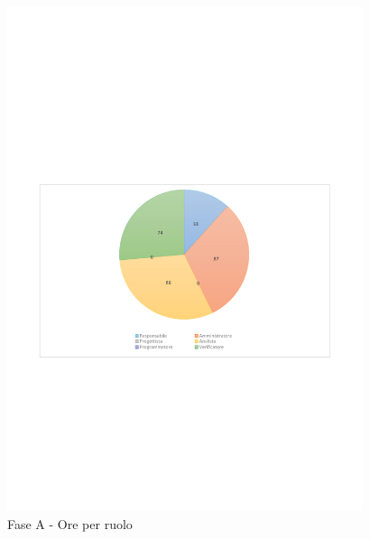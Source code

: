 \documentclass[../PianoProgetto.tex]{subfiles}
\begin{document}
	\begin{figure}[H]
		\centering
		\includegraphics[width=0.93\textwidth , trim=1.5cm 9cm 1.5cm 9cm]{grafici/A/A-ore-ruolo}
			\caption{Fase A - Ore per ruolo}
		\label{fig:CircleChart-faseA_ore_r}
	\end{figure}
	\vfill
	\newpage
	\vfill	
\end{document}
